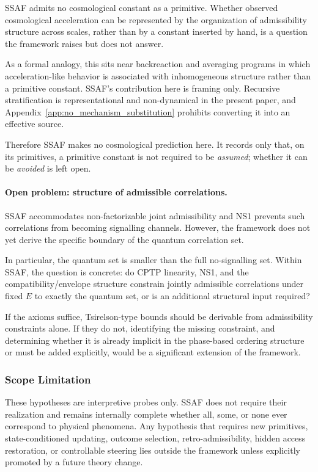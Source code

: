 \documentclass[aps,prx,onecolumn,11pt]{revtex4-2}
\theoremstyle{plain}
\theoremstyle{definition}
\theoremstyle{remark}
\begin{document}
SSAF admits no cosmological constant as a primitive. Whether observed
cosmological acceleration can be represented by the organization of
admissibility structure across scales, rather than by a constant
inserted by hand, is a question the framework raises but does not
answer.

As a formal analogy, this sits near backreaction and averaging programs
in which acceleration-like behavior is associated with inhomogeneous
structure rather than a primitive constant. SSAF's contribution here is
framing only. Recursive stratification is representational and
non-dynamical in the present paper, and Appendix~\ref{app:no_mechanism_substitution}
prohibits converting it into an effective source.

Therefore SSAF makes no cosmological prediction here. It records only
that, on its primitives, a primitive constant is not required to be
\emph{assumed}; whether it can be \emph{avoided} is left open.

\paragraph{Open problem: structure of admissible correlations.}

SSAF accommodates non-factorizable joint admissibility and NS1 prevents
such correlations from becoming signalling channels. However, the
framework does not yet derive the specific boundary of the quantum
correlation set.

In particular, the quantum set is smaller than the full no-signalling
set. Within SSAF, the question is concrete: do CPTP linearity, NS1, and
the compatibility/envelope structure constrain jointly admissible
correlations under fixed \(E\) to exactly the quantum set, or is an
additional structural input required?

If the axioms suffice, Tsirelson-type bounds should be derivable from
admissibility constraints alone. If they do not, identifying the missing
constraint, and determining whether it is already implicit in the
phase-based ordering structure or must be added explicitly, would be a
significant extension of the framework.

\subsubsection{Scope Limitation}
\label{subsec:hyp_scope_limitation}

These hypotheses are interpretive probes only. SSAF does not require
their realization and remains internally complete whether all, some, or
none ever correspond to physical phenomena. Any hypothesis that requires
new primitives, state-conditioned updating, outcome selection,
retro-admissibility, hidden access restoration, or controllable
steering lies outside the framework unless explicitly promoted by a
future theory change.
\end{document}
